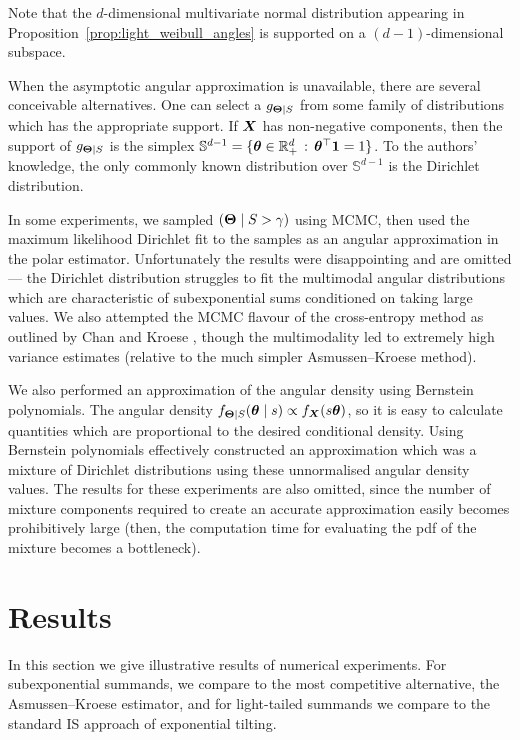 Note that the $d$-dimensional multivariate normal distribution appearing in Proposition~\ref{prop:light_weibull_angles} is supported on a $(d-1)$-dimensional subspace.

When the asymptotic angular approximation is unavailable, there are several conceivable alternatives.
One can select a $g_{\bm{\Theta} \mid S}$ from some family of distributions which has the appropriate support.
If $\bm{X}$ has non-negative components, then the support of $g_{\bm{\Theta} \mid S}$ is the simplex
$ \mathbb{S}^{d-1} = \{ \bm{\theta} \in \mathbb{R}_+^d \, : \, \bm{\theta}^\top\bm{1} = 1 \}$.
To the authors' knowledge, the only commonly known distribution over $\mathbb{S}^{d-1}$ is the Dirichlet distribution.

In some experiments, we sampled $(\bm{\Theta} \mid S > \gamma)$ using MCMC, then used the maximum likelihood Dirichlet fit to the samples as an angular approximation in the polar estimator. Unfortunately the results were disappointing and are omitted --- the Dirichlet distribution struggles to fit the multimodal angular distributions which are characteristic of subexponential sums conditioned on taking large values. We also attempted the MCMC flavour of the cross-entropy method as outlined by Chan and Kroese \cite{chan2012improved}, though the multimodality led to extremely high variance estimates (relative to the much simpler Asmussen--Kroese method).

We also performed an approximation of the angular density using Bernstein polynomials. The angular density $f_{\bm{\Theta} \mid S}(\bm{\theta} \mid s) \propto f_{\bm{X}}(s \bm{\theta})$, so it is easy to calculate quantities which are proportional to the desired conditional density. Using Bernstein polynomials effectively constructed an approximation which was a mixture of Dirichlet distributions using these unnormalised angular density values. The results for these experiments are also omitted, since the number of mixture components required to create an accurate approximation easily becomes prohibitively large (then, the computation time for evaluating the pdf of the mixture becomes a bottleneck).

\section{Results} \label{Sec:Results}


In this section we give illustrative results of numerical experiments.
For subexponential summands, we compare to the most competitive alternative, the Asmussen--Kroese
estimator, and for light-tailed summands we compare to the standard IS approach of exponential tilting.


